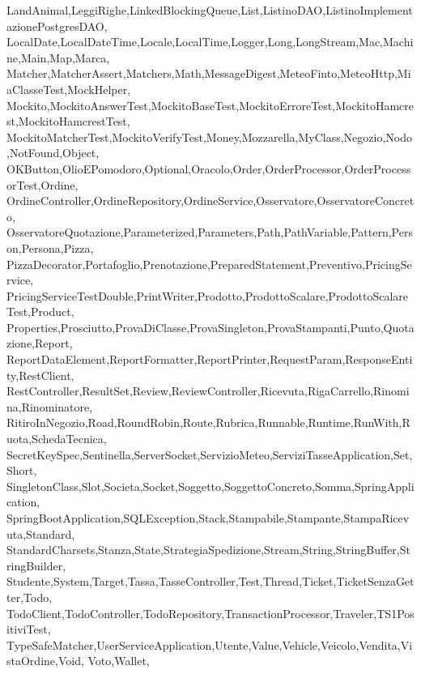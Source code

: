 {{    LandAnimal,LeggiRighe,LinkedBlockingQueue,List,ListinoDAO,ListinoImplementazionePostgresDAO,
    LocalDate,LocalDateTime,Locale,LocalTime,Logger,Long,LongStream,Mac,Machine,Main,Map,Marca,
    Matcher,MatcherAssert,Matchers,Math,MessageDigest,MeteoFinto,MeteoHttp,MiaClasseTest,MockHelper,
    Mockito,MockitoAnswerTest,MockitoBaseTest,MockitoErroreTest,MockitoHamcrest,MockitoHamcrestTest,
    MockitoMatcherTest,MockitoVerifyTest,Money,Mozzarella,MyClass,Negozio,Nodo,NotFound,Object,
    OKButton,OlioEPomodoro,Optional,Oracolo,Order,OrderProcessor,OrderProcessorTest,Ordine,
    OrdineController,OrdineRepository,OrdineService,Osservatore,OsservatoreConcreto,
    OsservatoreQuotazione,Parameterized,Parameters,Path,PathVariable,Pattern,Person,Persona,Pizza,
    PizzaDecorator,Portafoglio,Prenotazione,PreparedStatement,Preventivo,PricingService,
    PricingServiceTestDouble,PrintWriter,Prodotto,ProdottoScalare,ProdottoScalareTest,Product,
    Properties,Prosciutto,ProvaDiClasse,ProvaSingleton,ProvaStampanti,Punto,Quotazione,Report,
    ReportDataElement,ReportFormatter,ReportPrinter,RequestParam,ResponseEntity,RestClient,
    RestController,ResultSet,Review,ReviewController,Ricevuta,RigaCarrello,Rinomina,Rinominatore,
    RitiroInNegozio,Road,RoundRobin,Route,Rubrica,Runnable,Runtime,RunWith,Ruota,SchedaTecnica,
    SecretKeySpec,Sentinella,ServerSocket,ServizioMeteo,ServiziTasseApplication,Set,Short,
    SingletonClass,Slot,Societa,Socket,Soggetto,SoggettoConcreto,Somma,SpringApplication,
    SpringBootApplication,SQLException,Stack,Stampabile,Stampante,StampaRicevuta,Standard,
    StandardCharsets,Stanza,State,StrategiaSpedizione,Stream,String,StringBuffer,StringBuilder,
    Studente,System,Target,Tassa,TasseController,Test,Thread,Ticket,TicketSenzaGetter,Todo,
    TodoClient,TodoController,TodoRepository,TransactionProcessor,Traveler,TS1PositiviTest,
    TypeSafeMatcher,UserServiceApplication,Utente,Value,Vehicle,Veicolo,Vendita,VistaOrdine,Void,
    Voto,Wallet},
}
